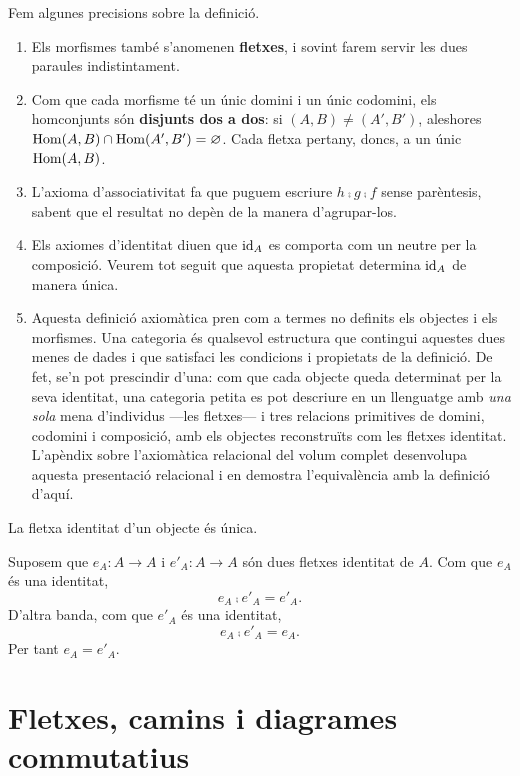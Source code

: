 \begin{observacio}
Fem algunes precisions sobre la definició.
\begin{enumerate}
\item Els morfismes també s'anomenen \textbf{fletxes}, i sovint farem servir les dues paraules indistintament.
\item Com que cada morfisme té un únic domini i un únic codomini, els homconjunts són \textbf{disjunts dos a dos}: si $(A,B)\neq(A',B')$, aleshores $\operatorname{Hom}(A,B)\cap\operatorname{Hom}(A',B')=\varnothing$. Cada fletxa pertany, doncs, a un únic $\operatorname{Hom}(A,B)$.
\item L'axioma d'associativitat fa que puguem escriure $h\comp g\comp f$ sense parèntesis, sabent que el resultat no depèn de la manera d'agrupar-los.
\item Els axiomes d'identitat diuen que $\operatorname{id}_A$ es comporta com un neutre per la composició. Veurem tot seguit que aquesta propietat determina $\operatorname{id}_A$ de manera única.
\item Aquesta definició axiomàtica pren com a termes no definits els objectes i els morfismes. Una categoria és qualsevol estructura que contingui aquestes dues menes de dades i que satisfaci les condicions i propietats de la definició. De fet, se'n pot prescindir d'una: com que cada objecte queda determinat per la seva identitat, una categoria petita es pot descriure en un llenguatge amb \emph{una sola} mena d'individus ---les fletxes--- i tres relacions primitives de domini, codomini i composició, amb els objectes reconstruïts com les fletxes identitat. L'apèndix sobre l’axiomàtica relacional del volum complet desenvolupa aquesta presentació relacional i en demostra l'equivalència amb la definició d'aquí.
\end{enumerate}
\end{observacio}

\begin{proposicio}
La fletxa identitat d'un objecte és única.
\end{proposicio}

\begin{prova}
Suposem que $e_A\colon A\to A$ i $e'_A\colon A\to A$ són dues fletxes identitat de $A$. Com que $e_A$ és una identitat,
\[
e_A\comp e'_A=e'_A.
\]
D'altra banda, com que $e'_A$ és una identitat,
\[
e_A\comp e'_A=e_A.
\]
Per tant $e_A=e'_A$.
\end{prova}

\section{Fletxes, camins i diagrames commutatius}

